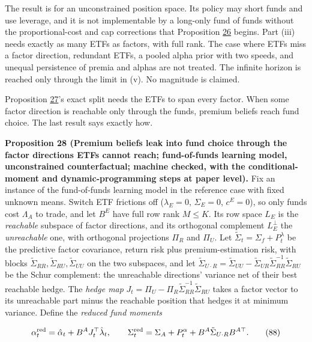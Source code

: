 \documentclass[11pt]{article}
\begin{document}
The result is for an unconstrained position space. Its policy may
short funds and use leverage, and it is not implementable by a
long-only fund of funds without the proportional-cost and cap
corrections that Proposition \hyperref[res:Proposition-26]{26} begins. Part (iii) needs exactly as
many ETFs as factors, with full rank. The case where ETFs miss a factor
direction, redundant ETFs, a pooled alpha prior with two speeds, and
unequal persistence of premia and alphas are not treated. The infinite
horizon is reached only through the limit in (v). No magnitude is
claimed.

Proposition \hyperref[res:Proposition-27]{27}'s exact split needs the ETFs to span every factor.
When some factor direction is reachable only through the funds,
premium beliefs reach fund choice. The last result says exactly how.

\label{res:Proposition-28}
\textbf{Proposition 28 (Premium beliefs leak into fund choice through the factor directions ETFs cannot reach; fund-of-funds learning model, unconstrained counterfactual; machine checked, with the conditional-moment and dynamic-programming steps at paper level).}
Fix an instance of the fund-of-funds learning model in the reference
case with fixed unknown means. Switch ETF frictions off
(\(\lambda_E=0\), \(\Sigma_E=0\), \(c^E=0\)), so only funds cost \(\Lambda_A\) to
trade, and let \(B^E\) have full row rank \(M\leq K\). Its row space
\(L_E\) is the \emph{reachable} subspace of factor directions, and its
orthogonal complement \(L_E^\perp\) the \emph{unreachable} one, with
orthogonal projections \(\Pi_R\) and \(\Pi_U\). Let
\(\tilde\Sigma_t=\Sigma_f+P^\lambda_t\) be the predictive factor covariance,
return risk plus premium-estimation risk, with blocks
\(\tilde\Sigma_{RR},\tilde\Sigma_{RU},\tilde\Sigma_{UU}\) on the two subspaces, and let
\(\tilde\Sigma_{U\cdot R}=\tilde\Sigma_{UU}-\tilde\Sigma_{UR}\tilde\Sigma_{RR}^{-1}\tilde\Sigma_{RU}\)
be the Schur complement: the unreachable directions' variance net of
their best reachable hedge. The \emph{hedge map}
\(J_t=\Pi_U-\Pi_R\tilde\Sigma_{RR}^{-1}\tilde\Sigma_{RU}\) takes a factor vector
to its unreachable part minus the reachable position that hedges it
at minimum variance. Define the \emph{reduced fund moments}

\begin{equation*}
\alpha^{\rm red}_t=\hat\alpha_t+B^AJ_t^\top\hat\lambda_t,\qquad
\Sigma^{\rm red}_t=\Sigma_A+P^\alpha_t+B^A\tilde\Sigma_{U\cdot R}B^{A\top}.\tag{88}\label{eq:88}
\end{equation*}
\end{document}
